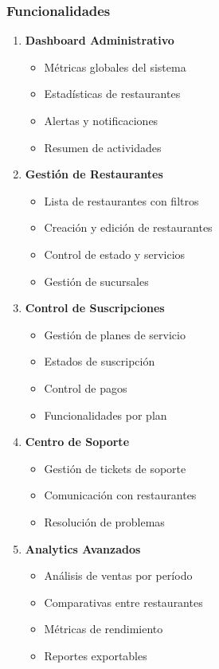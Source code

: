 \documentclass[12pt,a4paper]{article}
\begin{document}
\subsubsection{Funcionalidades}
\begin{enumerate}
    \item \textbf{Dashboard Administrativo}
    \begin{itemize}
        \item Métricas globales del sistema
        \item Estadísticas de restaurantes
        \item Alertas y notificaciones
        \item Resumen de actividades
    \end{itemize}
    
    \item \textbf{Gestión de Restaurantes}
    \begin{itemize}
        \item Lista de restaurantes con filtros
        \item Creación y edición de restaurantes
        \item Control de estado y servicios
        \item Gestión de sucursales
    \end{itemize}
    
    \item \textbf{Control de Suscripciones}
    \begin{itemize}
        \item Gestión de planes de servicio
        \item Estados de suscripción
        \item Control de pagos
        \item Funcionalidades por plan
    \end{itemize}
    
    \item \textbf{Centro de Soporte}
    \begin{itemize}
        \item Gestión de tickets de soporte
        \item Comunicación con restaurantes
        \item Resolución de problemas
    \end{itemize}
    
    \item \textbf{Analytics Avanzados}
    \begin{itemize}
        \item Análisis de ventas por período
        \item Comparativas entre restaurantes
        \item Métricas de rendimiento
        \item Reportes exportables
    \end{itemize}
    

\end{enumerate}
\end{document}
